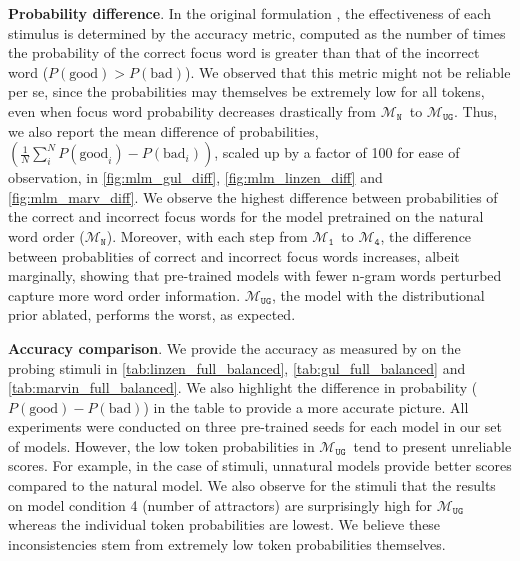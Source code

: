 \documentclass[letterpaper, 12pt]{report}
\newcommand{\xhdr}[1]{{\noindent\bfseries #1}.}
\newcommand{\OR}{$\mathcal{M}_{\texttt{N}}$}
\newcommand{\RI}{$\mathcal{M}_{\texttt{1}}$}
\newcommand{\RIV}{$\mathcal{M}_{\texttt{4}}$}
\newcommand{\RC}{$\mathcal{M}_{\texttt{UG}}$}
\begin{document}
\xhdr{Probability difference} In the original formulation \citep{goldberg2019assessing, wolf2019}, the effectiveness of each stimulus is determined by the accuracy metric, computed as the number of times the probability of the correct focus word is greater than that of the incorrect word ($P(\textrm{good}) > P(\textrm{bad})$). We observed that this metric might not be reliable per se, since the probabilities may themselves be extremely low for all tokens, even when focus word probability decreases drastically from \OR\ to \RC.
Thus, we also report the mean difference of probabilities, $(\frac{1}{N}\sum_{i}^N P(\textrm{good}_i) - P(\textrm{bad}_i))$, scaled up by a factor of 100 for ease of observation, in \autoref{fig:mlm_gul_diff}, \autoref{fig:mlm_linzen_diff} and \autoref{fig:mlm_marv_diff}.
We observe the highest difference between probabilities of the correct and incorrect focus words for the model pretrained on the natural word order (\OR). Moreover, with each step from \RI\ to \RIV, the difference between probablities of correct and incorrect focus words increases, albeit marginally, showing that pre-trained models with fewer n-gram words perturbed capture more word order information. \RC, the model with the distributional prior ablated, performs the worst, as expected.





\xhdr{Accuracy comparison}
We provide the accuracy as measured by \citet{goldberg2019assessing, wolf2019} on the probing stimuli in \autoref{tab:linzen_full_balanced}, \autoref{tab:gul_full_balanced} and \autoref{tab:marvin_full_balanced}. We also highlight the difference in probability ($P(\textrm{good}) - P(\textrm{bad})$) in the table to provide a more accurate picture. All experiments were conducted on three pre-trained seeds for each model in our set of models. However, the low token probabilities in \RC\ tend to present unreliable scores. For example, in the case of \citet{gulordava-etal-2018-colorless} stimuli, unnatural models provide better scores compared to the natural model. We also observe for the \citet{linzen-etal-2016-assessing} stimuli that the results on model condition 4 (number of attractors) are surprisingly high for \RC\, whereas the individual token probabilities are lowest. We believe these inconsistencies stem from extremely low token probabilities themselves.  %
\end{document}
